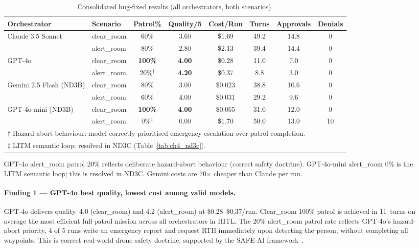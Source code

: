\begin{table}[ht]
  \caption{Consolidated bug-fixed results (all orchestrators, both scenarios).}
  \label{tab:ch4_nd3b}
  \centering
  \small
  \begin{tabular}{llcccccc}
    \toprule
    Orchestrator & Scenario & Patrol\% & Quality/5 & Cost/Run & Turns & Approvals & Denials \\
    \midrule
    \multirow{2}{*}{Claude 3.5 Sonnet}
      & clear\_room & 60\%   & 3.60 & \$1.69 & 49.2 & 14.8 & 0 \\
      & alert\_room & 80\%   & 2.80 & \$2.13 & 39.4 & 14.4 & 0 \\
    \midrule
    \multirow{2}{*}{GPT-4o}
      & clear\_room & \textbf{100\%} & \textbf{4.00} & \$0.28 & 11.0 & 7.0 & 0 \\
      & alert\_room & 20\%$^\dagger$ & \textbf{4.20} & \$0.37 & 8.8  & 3.0 & 0 \\
    \midrule
    \multirow{2}{*}{Gemini 2.5 Flash (ND3B)}
      & clear\_room & 80\%   & 3.00 & \$0.023 & 38.8 & 10.6 & 0 \\
      & alert\_room & 60\%   & 4.00 & \$0.031 & 29.2 & 9.6  & 0 \\
    \midrule
    \multirow{2}{*}{GPT-4o-mini (ND3B)}
      & clear\_room & \textbf{100\%} & \textbf{4.00} & \$0.065 & 31.0 & 12.0 & 0 \\
      & alert\_room & 0\%$^\ddagger$ & 0.00 & \$1.70 & 50.0 & 13.0 & 10 \\
    \bottomrule
    \multicolumn{8}{l}{\footnotesize $\dagger$ Hazard-abort behaviour: model correctly
      prioritised emergency escalation over patrol completion.} \\
    \multicolumn{8}{l}{\footnotesize $\ddagger$ LITM semantic loop; resolved in ND3C
      (Table~\ref{tab:ch4_nd3c}).}
  \end{tabular}
\end{table}


    GPT-4o alert\_room patrol 20\% reflects deliberate hazard-abort behaviour (correct
    safety doctrine).  GPT-4o-mini alert\_room 0\% is the LITM semantic loop;
    this is resolved in ND3C.  Gemini costs are 70$\times$ cheaper than Claude per run.
    
\paragraph{Finding 1 --- GPT-4o best quality, lowest cost among valid models.}
GPT-4o delivers quality~4.0 (clear\_room) and 4.2 (alert\_room) at \$0.28--\$0.37/run.
Clear\_room 100\% patrol is achieved in 11~turns on average the most efficient full-patrol mission across all orchestrators in HITL.
The 20\% alert\_room patrol rate reflects GPT-4o's hazard-abort priority, 4 of 5 runs write an emergency report and request RTH immediately upon detecting the person, without completing all waypoints.
This is correct real-world drone safety doctrine, supported by the SAFE-AI framework~\cite{sanneman2022safeai}.


